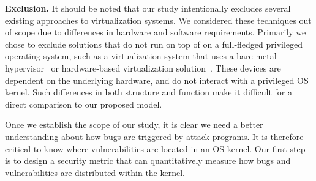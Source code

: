 \noindent
\textbf{Exclusion.}
It should be noted that our study intentionally excludes several existing
approaches to virtualization systems. We considered these techniques
out of scope due to differences in hardware and software requirements.
Primarily we chose to exclude solutions that do not run on top of on a full-fledged
privileged operating system, such as a virtualization system that uses a
bare-metal hypervisor~\cite{Xen-03} or hardware-based virtualization
solution~\cite{IntelVT}.
These devices are dependent on the underlying hardware, and do not interact
with a privileged OS kernel. Such differences in both structure and function
make it difficult for a direct comparison to our proposed model.

Once we establish the scope of our study, it is clear we need a better understanding about how
bugs are triggered by attack programs. It is therefore critical to know where
vulnerabilities are located in an OS kernel. Our first step is to design
a security metric that can quantitatively measure how bugs and vulnerabilities
are distributed within the kernel.
